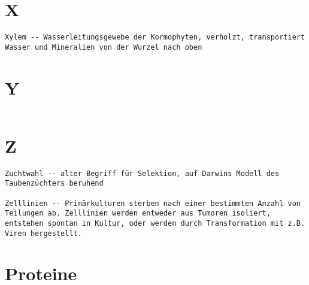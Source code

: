 \documentclass{article}
\begin{document}
\section{X}
\begin{verbatim}
Xylem -- Wasserleitungsgewebe der Kormophyten, verholzt, transportiert Wasser und Mineralien von der Wurzel nach oben

\end{verbatim}
\newpage


\section{Y}
\begin{verbatim}

\end{verbatim}
\newpage


\section{Z}
\begin{verbatim}
Zuchtwahl -- alter Begriff für Selektion, auf Darwins Modell des Taubenzüchters beruhend

Zelllinien -- Primärkulturen sterben nach einer bestimmten Anzahl von Teilungen ab. Zelllinien werden entweder aus Tumoren isoliert, entstehen spontan in Kultur, oder werden durch Transformation mit z.B. Viren hergestellt.

\end{verbatim}
\newpage


\section{Proteine}
\end{document}
